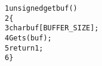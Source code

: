 \begin{alltt}
{\scriptsize   1} unsigned getbuf()
{\scriptsize   2} \verb:{:
{\scriptsize   3}     char buf[BUFFER_SIZE];
{\scriptsize   4}     Gets(buf);
{\scriptsize   5}     return 1;
{\scriptsize   6} \verb:}:
\end{alltt}
